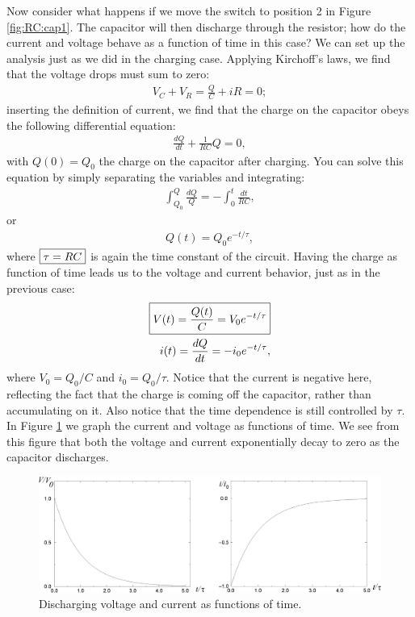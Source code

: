 Now consider what happens if we move the switch to position 2 in Figure
\ref{fig:RC:cap1}. The capacitor will then discharge through the resistor; how 
do the current and voltage behave as a function of time in this case? We can 
set up the analysis just as we did in the charging case. Applying Kirchoff's 
laws, we find that the voltage drops must sum to zero:
\begin{eqnarray*}
V_C+V_R = \frac{Q}{C} + iR = 0;
\end{eqnarray*}
inserting the definition of current, we find that the charge on the capacitor
obeys the following differential equation:
\begin{eqnarray*}
\frac{dQ}{dt} + \frac{1}{RC}Q = 0,
\end{eqnarray*}
with $Q(0)=Q_0$ the charge on the capacitor after charging. You can solve this
equation by simply separating the variables and integrating:
\begin{eqnarray*}
\int_{Q_0}^{Q} \frac{dQ}{Q} = - \int_0^t \frac{dt}{RC},
\end{eqnarray*}
or 
\begin{eqnarray*}
Q(t) = Q_0 e^{-t/\tau},
\end{eqnarray*}
where $\fbox{$ \displaystyle \tau = RC $}$  is again the time constant of the circuit. Having the charge
as function of time leads us to the voltage and current behavior, just as in 
the previous case:
\begin{eqnarray}
\fbox{$ \displaystyle V(t) = \frac{Q(t)}{C} = V_0 e^{-t/\tau} $} \label{eq:RC:discharge voltage}\\
i(t) = \frac{dQ}{dt} = - i_0 e^{-t/\tau},\nonumber
\end{eqnarray}
where $V_0 = Q_0/C$ and $i_0 = Q_0/\tau$. Notice that the current is negative
here, reflecting the fact that the charge is coming off the capacitor, rather 
than accumulating on it. Also notice that the time dependence is still 
controlled by $\tau$. In Figure \ref{fig:RC:dischargingiv} we graph the 
current and voltage as functions of time. We see from this figure that both 
the voltage and current exponentially decay to zero as the capacitor 
discharges.
\begin{figure}[htb]
\centering 
\epsfxsize=8cm \includegraphics[scale=0.4]{5_rccircuits/dischargevi.eps}
\caption{Discharging voltage and current as functions of time.}
\label{fig:RC:dischargingiv}
\end{figure}

